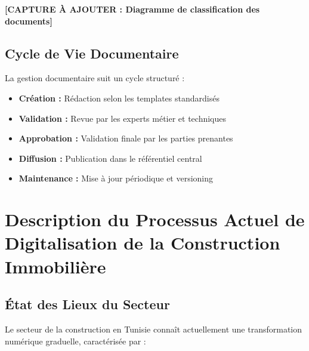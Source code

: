 \textbf{[CAPTURE À AJOUTER : Diagramme de classification des documents]}

\subsection{Cycle de Vie Documentaire}

La gestion documentaire suit un cycle structuré :

\begin{itemize}
    \item \textbf{Création :} Rédaction selon les templates standardisés
    \item \textbf{Validation :} Revue par les experts métier et techniques
    \item \textbf{Approbation :} Validation finale par les parties prenantes
    \item \textbf{Diffusion :} Publication dans le référentiel central
    \item \textbf{Maintenance :} Mise à jour périodique et versioning
\end{itemize}

\section{Description du Processus Actuel de Digitalisation de la Construction Immobilière}

\subsection{État des Lieux du Secteur}

Le secteur de la construction en Tunisie connaît actuellement une transformation numérique graduelle, caractérisée par :

